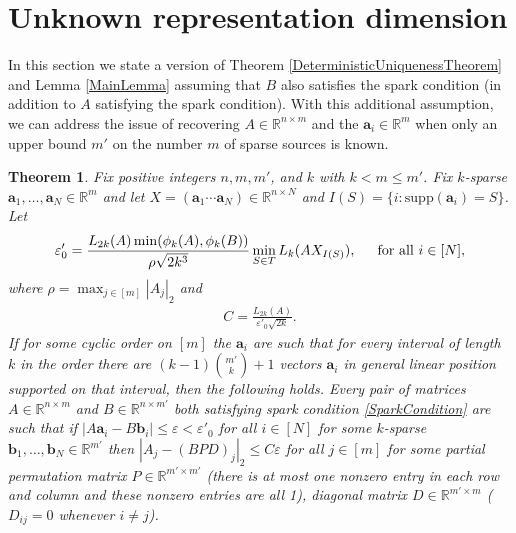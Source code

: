 \documentclass[journal, onecolumn]{IEEEtran}
\newtheorem{theorem}{Theorem}
\begin{document}
\section{Unknown representation dimension}\label{mleqm}

In this section we state a version of Theorem \ref{DeterministicUniquenessTheorem} and Lemma \ref{MainLemma} assuming that $B$ also satisfies the spark condition (in addition to $A$ satisfying the spark condition). With this additional assumption, we can address the issue of recovering $A \in \mathbb{R}^{n \times m}$ and the $\mathbf{a}_i \in \mathbb{R}^m$ when only an upper bound $m'$ on the number $m$ of sparse sources is known. 
\begin{theorem}\label{DeterministicUniquenessTheorem2}
Fix positive integers $n, m, m'$, and $k$ with $k < m \leq m'$. Fix $k$-sparse $\mathbf{a}_1, \ldots, \mathbf{a}_N \in \mathbb{R}^m$ and let $X  = (\mathbf{a}_1 \cdots \mathbf{a}_N) \in \mathbb{R}^{n \times N}$ and $I(S) = \{i : \text{supp}(\mathbf{a}_i) = S\}$. Let
\begin{align}\label{epsilon0'}
\varepsilon'_0 = \frac{ L_{2k}(A) \min(\phi_k(A), \phi_k(B))}{\rho \sqrt{2k^3} } \min_{S \in T} L_k(AX_{I(S)}),\indent \text{for all } i \in [N],
\end{align}
%
where $\rho = \max_{j \in [m]} |A_j|_2$ and
\begin{align}\label{C'}
C = \frac{L_{2k}(A)}{ \varepsilon'_0 \sqrt{2k}}.
\end{align}
If for some cyclic order on $[m]$ the $\mathbf{a}_i$ are such that for every interval of length $k$ in the order there are $(k-1){m' \choose k}+1$ vectors $\mathbf{a}_i$ in general linear position supported on that interval, then the following holds. Every pair of matrices $A \in \mathbb{R}^{n \times m}$ and $B \in \mathbb{R}^{n \times m'}$ both satisfying spark condition \eqref{SparkCondition} are such that if $|A\mathbf{a}_i - B\mathbf{b}_i| \leq \varepsilon < \varepsilon'_0$ for all $i \in [N]$ for some $k$-sparse $\mathbf{b}_1, \ldots, \mathbf{b}_N \in \mathbb{R}^{m'}$ then $|A_j-(BPD)_j|_2 \leq C\varepsilon$ for all $j \in [m]$ for some partial permutation matrix $P \in \mathbb{R}^{m' \times m'}$ (there is at most one nonzero entry in each row and column and these nonzero entries are all 1), diagonal matrix $D \in \mathbb{R}^{m' \times m}$ ($D_{ij} = 0$ whenever $i \neq j$).
\end{theorem}
\end{document}
